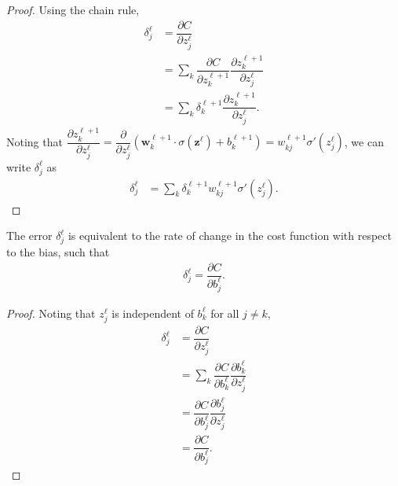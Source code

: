 \begin{proof}
	Using the chain rule,
	\begin{align*}
		\delta_j^\ell & = \dfrac{\partial C}{\partial z_j^\ell}\\[0.7em]
		& = \sum_k\dfrac{\partial C}{\partial z_k^{\ell+1}}\dfrac{\partial z_k^{\ell+1}}{\partial z_j^\ell} \\[0.7em]
		& = \sum_k\delta_k^{\ell+1}\dfrac{\partial z_k^{\ell+1}}{\partial z_j^\ell}.
	\end{align*}
	Noting that $\dfrac{\partial z_k^{\ell+1}}{\partial z_j^\ell} = \dfrac{\partial}{\partial z_j^\ell}(\mathbf{w}_k^{\ell+1}\cdot \sigma(\mathbf{z}^\ell) + b_k^{\ell+1}) = w_{kj}^{\ell+1}\sigma'(z_j^\ell)$, we can write $\delta_j^\ell$ as
	\begin{align*}
		\delta_j^\ell & = \sum_k\delta_k^{\ell+1}w_{kj}^{\ell+1}\sigma'(z_j^\ell).
	\end{align*}
\end{proof}

\begin{lemma}
	The error $\delta_j^\ell$ is equivalent to the rate of change in the cost function with respect to the bias, such that
	\begin{align}\label{nnets-bprop-eq3}
		\delta_j^\ell = \dfrac{\partial C}{\partial b_j^\ell}.
	\end{align}
\end{lemma}
\begin{proof}
	Noting that $z_j^\ell$ is independent of $b_k^\ell$ for all $j \neq k$,
	\begin{align*}
		\delta_j^\ell & = \dfrac{\partial C}{\partial z_j^\ell} \\[0.7em]
		& = \sum_k\dfrac{\partial C}{\partial b_k^\ell}\dfrac{\partial b_k^\ell}{\partial z_j^\ell}\\[0.7em]
		& = \dfrac{\partial C}{\partial b_j^\ell}\dfrac{\partial b_j^\ell}{\partial z_j^\ell} \\[0.7em]
		& = \dfrac{\partial C}{\partial b_j^\ell}.
	\end{align*}
\end{proof}


